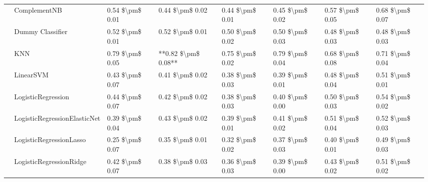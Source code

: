 \begin{tabular}{llllllll}
   & ComplementNB &      0.54 \$\textbackslash pm\$ 0.01 &           0.44 \$\textbackslash pm\$ 0.02 &       0.44 \$\textbackslash pm\$ 0.01 &        0.45 \$\textbackslash pm\$ 0.02 &                         0.57 \$\textbackslash pm\$ 0.05 &      0.68 \$\textbackslash pm\$ 0.07 \\
   & Dummy Classifier &      0.52 \$\textbackslash pm\$ 0.01 &           0.52 \$\textbackslash pm\$ 0.01 &       0.50 \$\textbackslash pm\$ 0.02 &        0.50 \$\textbackslash pm\$ 0.03 &                         0.48 \$\textbackslash pm\$ 0.03 &      0.48 \$\textbackslash pm\$ 0.03 \\
   & KNN &      0.79 \$\textbackslash pm\$ 0.05 &       **0.82 \$\textbackslash pm\$ 0.08** &       0.75 \$\textbackslash pm\$ 0.02 &        0.79 \$\textbackslash pm\$ 0.04 &                         0.68 \$\textbackslash pm\$ 0.08 &      0.71 \$\textbackslash pm\$ 0.04 \\
   & LinearSVM &      0.43 \$\textbackslash pm\$ 0.07 &           0.41 \$\textbackslash pm\$ 0.02 &       0.38 \$\textbackslash pm\$ 0.03 &        0.39 \$\textbackslash pm\$ 0.01 &                         0.48 \$\textbackslash pm\$ 0.04 &      0.51 \$\textbackslash pm\$ 0.01 \\
   & LogisticRegression &      0.44 \$\textbackslash pm\$ 0.07 &           0.42 \$\textbackslash pm\$ 0.02 &       0.38 \$\textbackslash pm\$ 0.03 &        0.40 \$\textbackslash pm\$ 0.00 &                         0.50 \$\textbackslash pm\$ 0.03 &      0.54 \$\textbackslash pm\$ 0.02 \\
   & LogisticRegressionElasticNet &      0.39 \$\textbackslash pm\$ 0.04 &           0.43 \$\textbackslash pm\$ 0.02 &       0.39 \$\textbackslash pm\$ 0.01 &        0.41 \$\textbackslash pm\$ 0.02 &                         0.51 \$\textbackslash pm\$ 0.04 &      0.52 \$\textbackslash pm\$ 0.03 \\
   & LogisticRegressionLasso &      0.25 \$\textbackslash pm\$ 0.07 &           0.35 \$\textbackslash pm\$ 0.01 &       0.32 \$\textbackslash pm\$ 0.02 &        0.37 \$\textbackslash pm\$ 0.03 &                         0.40 \$\textbackslash pm\$ 0.01 &      0.49 \$\textbackslash pm\$ 0.03 \\
   & LogisticRegressionRidge &      0.42 \$\textbackslash pm\$ 0.07 &           0.38 \$\textbackslash pm\$ 0.03 &       0.36 \$\textbackslash pm\$ 0.03 &        0.39 \$\textbackslash pm\$ 0.00 &                         0.43 \$\textbackslash pm\$ 0.02 &      0.51 \$\textbackslash pm\$ 0.02 \\

\end{tabular}
